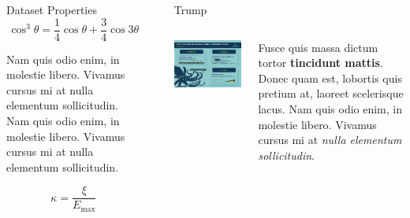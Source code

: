 \documentclass[final]{beamer}
\newlength{\sepwid}
\newlength{\onecolwid}
\newlength{\twocolwid}
\begin{document}
\begin{frame}[t]
\begin{columns}[t]
\begin{column}{\onecolwid}
\begin{block}{Dataset Properties}
\begin{equation}
\cos^3 \theta =\frac{1}{4}\cos\theta+\frac{3}{4}\cos 3\theta
\label{eq:refname}
\end{equation}

Nam quis odio enim, in molestie libero. Vivamus cursus mi at nulla elementum sollicitudin. Nam quis odio enim, in molestie libero. Vivamus cursus mi at nulla elementum sollicitudin.

\begin{equation}
\kappa =\frac{\xi}{E_{\mathrm{max}}} %
\end{equation}

\end{block}


\end{column} %



\begin{column}{\sepwid}\end{column} %

\begin{column}{\twocolwid} %


\begin{block}{Trump}

\begin{columns}[onlytextwidth]
    \begin{column}{.45\textwidth}
        \includegraphics[width=0.8\linewidth]{design_guidelines.png} 
    \end{column}
    \begin{column}{.55\textwidth}
        Fusce quis massa dictum tortor \textbf{tincidunt mattis}. Donec quam est, lobortis quis pretium at, laoreet scelerisque lacus. Nam quis odio enim, in molestie libero. Vivamus cursus mi at \textit{nulla elementum sollicitudin}.
    \end{column}
\end{columns}


\end{block}
\end{column}
\end{columns}
\end{frame}
\end{document}
